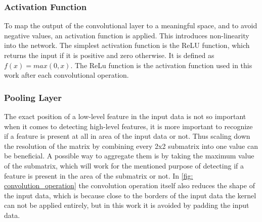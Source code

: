 \subsubsection*{Activation Function}

To map the output of the convolutional layer to a meaningful space, and to avoid negative values, an activation function is applied. This introduces non-linearity into the network. The simplest activation function is the ReLU function, which returns the input if it is positive and zero otherwise. It is defined as $f(x) = max(0, x)$. The ReLu function is the activation function used in this work after each convolutional operation.

\subsubsection*{Pooling Layer}

The exact position of a low-level feature in the input data is not so important when it comes to detecting high-level features,
it is more important to recognize if a feature is present at all in area of the input data or not.
Thus scaling down the resolution of the matrix by combining every 2x2 submatrix into one value can be beneficial.
A possible way to aggregate them is by taking the maximum value of the submatrix, which will work for the mentioned purpose of detecting if a feature is present in the area of the submatrix or not. In \autoref{fig: convolution_operation} the convolution operation itself also reduces the shape of the input data, which is because close to the borders of the input data the kernel can not be applied entirely, but in this work it is avoided by padding the input data.

